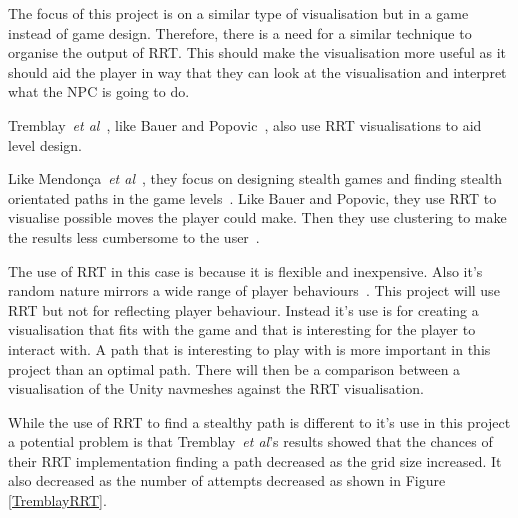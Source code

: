 \documentclass[journal]{IEEEtran}
\begin{document}
The focus of this project is on a similar type of  visualisation but in a game instead of game design. Therefore, there is a need for a similar technique to organise the output of RRT.  This should make the visualisation  more useful as it should aid the player in way that they can look at the visualisation and interpret what the NPC is going to do. 


Tremblay~\textit{et al}~\cite{Tremblay2013}, like Bauer and Popovic~\cite{bauer2012}, also use RRT visualisations to aid level design. 

Like Mendonça~\textit{et al}~\cite{Mendonça2015}, they focus on designing stealth games and finding stealth orientated paths in the game levels~\cite{Tremblay2013}. Like Bauer and Popovic, they use RRT to visualise possible moves the player could make. Then they use clustering to make the results less cumbersome to the user~\cite{Tremblay2013}. 

The use of RRT in this case is because it is flexible and inexpensive. Also it's random nature mirrors a wide range of player behaviours~\cite{Tremblay2013}. 
This project will use RRT but not for reflecting player behaviour.  Instead it's use  is for creating a visualisation that fits with the game and that is interesting for the player to interact with. A path that is interesting to play with is more important in this project than an optimal path. There will then be a comparison between a visualisation of the Unity navmeshes against the RRT visualisation.

While the use of RRT to find a stealthy path is different to it's use in this project a potential problem is that Tremblay~\textit{et al}'s results showed that the chances of their RRT implementation finding a path decreased as the grid size increased. It also decreased as the number of attempts decreased as shown in Figure \ref{TremblayRRT}. 

\end{document}

